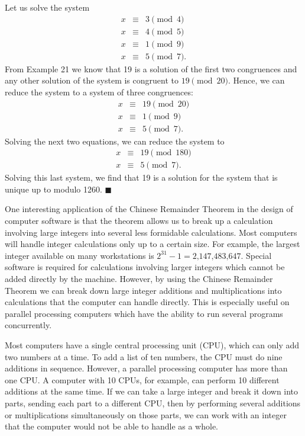  
\vspace{2ex}
 
 
Let us solve the system
\begin{eqnarray*}
x & \equiv & 3 \pmod{4} \\
x & \equiv & 4 \pmod{5} \\
x & \equiv & 1 \pmod{9} \\
x & \equiv & 5 \pmod{7}. 
\end{eqnarray*}
From Example 21 we know that 19 is a solution of the first two
congruences and any other solution of the system is congruent to $19
\pmod{20}$. Hence, we can reduce the system to a system of three 
congruences:
\begin{eqnarray*}
x & \equiv & 19 \pmod{20} \\
x & \equiv & 1 \pmod{9} \\
x & \equiv & 5 \pmod{7}. 
\end{eqnarray*}
Solving the next two equations, we can reduce the system to
\begin{eqnarray*}
x & \equiv & 19 \pmod{180} \\
x & \equiv & 5 \pmod{7}. 
\end{eqnarray*}
Solving this last system, we find that 19 is a solution for the system
that is unique up to modulo 1260.
\hspace{\fill} $\blacksquare$
 
 
\vspace{2ex}
 
 
One interesting application of the Chinese Remainder Theorem in the
design of computer software is that the theorem allows us to break up
a calculation involving large integers into several less formidable
calculations. Most computers will handle integer calculations only up
to a certain size.  For example, the largest integer available on many
workstations is $2^{31} - 1 = \mbox{2,147,483,647}$.  Special
software is required for calculations involving larger integers which 
cannot be added directly by the machine.  However, by using the Chinese
Remainder Theorem we can break down large integer additions and
multiplications into calculations that the computer can handle
directly. This is especially useful on parallel processing computers
which have the ability to
run several programs concurrently. 
 
Most computers have a single central
processing unit (CPU), which can only add two numbers at a time. To add 
a list of ten numbers, the CPU must do nine additions
in sequence. However, a parallel processing computer has more than
one CPU. A computer with 10 CPUs, for example,  can perform 10
different additions at the same time. If we can take a large integer 
and break
it down into parts, sending each part to a different CPU, then by
performing several additions or multiplications
simultaneously on those parts, we can work with an integer that the
computer would not be able to handle as a whole.  
 

